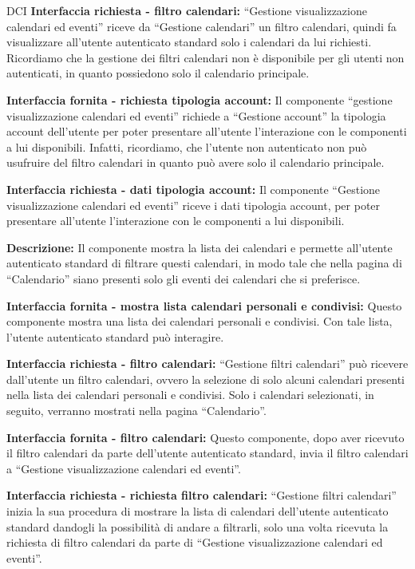 \begin{listaPersonale}{DCI}
    \textbf{Interfaccia richiesta - filtro calendari:} “Gestione visualizzazione calendari ed eventi” riceve da “Gestione calendari” un filtro calendari, quindi fa visualizzare all'utente autenticato standard solo i calendari da lui richiesti. Ricordiamo che la gestione dei filtri calendari non è disponibile per gli utenti non autenticati, in quanto possiedono solo il calendario principale.

    \textbf{Interfaccia fornita - richiesta tipologia account:} Il componente “gestione visualizzazione calendari ed eventi” richiede a “Gestione account”  la tipologia account dell'utente per poter presentare all'utente l'interazione con le componenti a lui disponibili. Infatti, ricordiamo, che l'utente non autenticato non può usufruire del filtro calendari in quanto può avere solo il calendario principale.

    \textbf{Interfaccia richiesta - dati tipologia account:} Il componente “Gestione visualizzazione calendari ed eventi” riceve i dati tipologia account, per poter presentare all'utente l'interazione con le componenti a lui disponibili.



    \textbf{Descrizione:} Il componente mostra la lista dei calendari e permette all'utente autenticato standard di filtrare questi calendari, in modo tale che nella pagina di “Calendario” siano presenti solo gli eventi dei calendari che si preferisce.

    \textbf{Interfaccia fornita - mostra lista calendari personali e condivisi:} Questo componente mostra una lista dei calendari personali e condivisi. Con tale lista, l'utente autenticato standard può interagire.

    \textbf{Interfaccia richiesta - filtro calendari:} “Gestione filtri calendari” può ricevere dall'utente un filtro calendari, ovvero la selezione di solo alcuni calendari presenti nella lista dei calendari personali e condivisi. Solo i calendari selezionati, in seguito, verranno mostrati nella pagina “Calendario”.

    \textbf{Interfaccia fornita - filtro calendari:} Questo componente, dopo aver ricevuto il filtro calendari da parte dell'utente autenticato standard, invia il filtro calendari a “Gestione visualizzazione calendari ed eventi”.


    \textbf{Interfaccia richiesta - richiesta filtro calendari:} “Gestione filtri calendari” inizia la sua procedura di mostrare la lista di calendari dell'utente autenticato standard dandogli la possibilità di andare a filtrarli, solo una volta ricevuta la richiesta di filtro calendari da parte di “Gestione visualizzazione calendari ed eventi”.



\end{listaPersonale}
